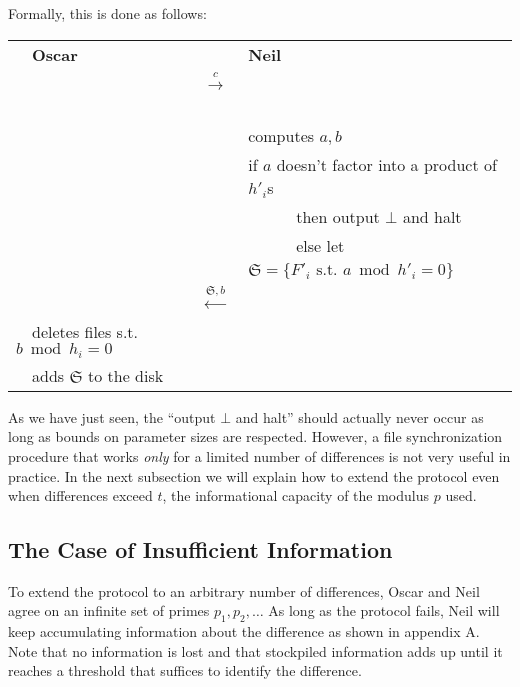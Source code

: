 \documentclass[11pt]{llncs}
\begin{document}
Formally, this is done as follows:\smallskip

\begin{center}
\begin{tabular}{|lcl|}\hline
~~{\bf Oscar}                       &                                                      &   {\bf Neil}~\\
                                   &~~{{\LARGE $\stackrel{c}{\longrightarrow}$}}~~        &   \\
                                   &                                                      &computes $a,b$~\\
                                   &                                                      &if $a$ doesn't factor into a product of $h'_i$s~\\
                                   &                                                      &~~~~~~then output $\bot$ and halt~\\
                                   &                                                      &~~~~~~else let $\mathfrak{S}=\{F'_i \mbox{~s.t.~} a \bmod h'_i =0\}$~~\\
                                   &~~{\LARGE $\stackrel{\mathfrak{S},b}{\longleftarrow}$}&\\
~~deletes files s.t. $b \bmod h_i =0$&                                                      &\\
~~adds $\mathfrak{S}$ to the disk    &                                                      &\\\hline
\end{tabular}
\end{center}

As we have just seen, the ``output $\bot$ and halt'' should actually never occur as long as bounds on parameter sizes are respected. However, a file synchronization procedure that works {\sl only} for a limited number of differences is not very useful in practice. In the next subsection we will explain how to extend the protocol even when differences exceed $t$, the informational capacity of the modulus $p$ used.

\subsection{The Case of Insufficient Information}
\label{insuf}
To extend the protocol to an arbitrary number of differences, Oscar and Neil agree on an infinite set of primes $p_1,p_2,\ldots$ As long as the protocol fails, Neil will keep accumulating information about the difference as shown in appendix A. Note that no information is lost and that  stockpiled information adds up until it reaches a threshold that suffices to identify the difference.\smallskip
\end{document}
